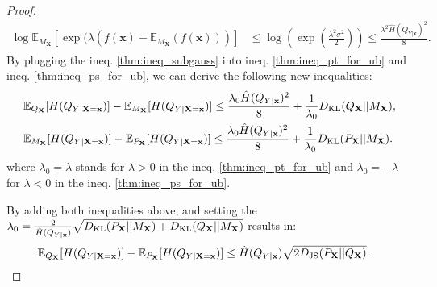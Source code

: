 \begin{proof}
\begin{equation} \label{thm:ineq_subgauss}
\begin{split}
\log\mathbb{E}_{M_{\mathbf{X}}}[\exp(\lambda(f(\mathbf{x}) - \mathbb{E}_{M_{\mathbf{X}}}(f(\mathbf{x})))] &\leq \log(\exp(\frac{\lambda^{2}\sigma^{2}}{2})) \leq \frac{\lambda^{2}\hat{H}(Q_{Y|\mathbf{x}})^{2}}{8}.
\end{split}
\end{equation}
By plugging the ineq. \eqref{thm:ineq_subgauss} into ineq. \eqref{thm:ineq_pt_for_ub} and ineq. \eqref{thm:ineq_ps_for_ub}, we can derive the following new inequalities:
\begin{equation*}
\begin{split}
&\mathbb{E}_{Q_{\mathbf{X}}}[H(Q_{Y|\mathbf{X}=\mathbf{x}})]-\mathbb{E}_{M_{\mathbf{X}}}[H(Q_{Y|\mathbf{X}=\mathbf{x}})] \leq \frac{\lambda_{0}\hat{H}(Q_{Y|\mathbf{x}})^{2}}{8} +\frac{1}{\lambda_{0}}D_{\rm KL}(Q_{\mathbf{X}}||M_{\mathbf{X}}), \\
&\mathbb{E}_{M_{\mathbf{X}}}[H(Q_{Y|\mathbf{X}=\mathbf{x}})]-\mathbb{E}_{P_{\mathbf{X}}}[H(Q_{Y|\mathbf{X}=\mathbf{x}})] \leq \frac{\lambda_{0}\hat{H}(Q_{Y|\mathbf{x}})^{2}}{8} + \frac{1}{\lambda_{0}}D_{\rm KL}(P_{\mathbf{X}}||M_{\mathbf{X}}).
\end{split}
\end{equation*}
where $\lambda_{0}=\lambda$ stands for $\lambda>0$ in the ineq. \eqref{thm:ineq_pt_for_ub} and $\lambda_{0}=-\lambda$ for $\lambda<0$ in the ineq. \eqref{thm:ineq_ps_for_ub}.

By adding both inequalities above, and setting the $\lambda_{0}=\frac{2}{\hat{H}(Q_{Y|\mathbf{x}})}\sqrt{D_{\rm KL}(P_{\mathbf{X}}||M_{\mathbf{X}})+D_{\rm KL}(Q_{\mathbf{X}}||M_{\mathbf{X}})}$ results in:
\begin{equation} \label{thm:ineq_up_ts}
\begin{split}
&\mathbb{E}_{Q_{\mathbf{X}}}[H(Q_{Y|\mathbf{X}=\mathbf{x}})] - \mathbb{E}_{P_{\mathbf{X}}}[H(Q_{Y|\mathbf{X}=\mathbf{x}})] \leq \hat{H}(Q_{Y|\mathbf{x}}) \sqrt{2 D_{\rm JS}(P_{\mathbf{X}}||Q_{\mathbf{X}})}.
\end{split}
\end{equation}



\end{proof}
